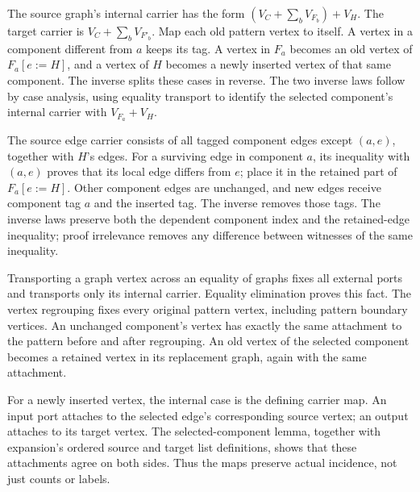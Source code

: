 



The source graph's internal carrier has the form
$(V_C+\sum_b V_{F_b})+V_H$. The target carrier is
$V_C+\sum_b V_{F'_b}$. Map each old pattern vertex to itself. A vertex in a
component different from $a$ keeps its tag. A vertex in $F_a$ becomes an
old vertex of $F_a[e:=H]$, and a vertex of $H$ becomes a newly inserted vertex
of that same component. The inverse splits these cases in reverse. The two
inverse laws follow by case analysis, using equality transport to identify
the selected component's internal carrier with $V_{F_a}+V_H$.







The source edge carrier consists of all tagged component edges except
$(a,e)$, together with $H$'s edges. For a surviving edge in component $a$,
its inequality with $(a,e)$ proves that its local edge differs from $e$;
place it in the retained part of $F_a[e:=H]$. Other component edges are
unchanged, and new edges receive component tag $a$ and the inserted tag.
The inverse removes those tags. The inverse laws preserve both the dependent
component index and the retained-edge inequality; proof irrelevance removes
any difference between witnesses of the same inequality.







Transporting a graph vertex across an equality of graphs fixes all external
ports and transports only its internal carrier. Equality elimination proves
this fact. The vertex regrouping fixes every original pattern vertex,
including pattern boundary vertices. An unchanged component's vertex has
exactly the same attachment to the pattern before and after regrouping.
An old vertex of the selected component becomes a retained vertex in its
replacement graph, again with the same attachment.

For a newly inserted vertex, the internal case is the defining carrier map.
An input port attaches to the selected edge's corresponding source vertex;
an output attaches to its target vertex. The selected-component lemma,
together with expansion's ordered source and target list definitions,
shows that these attachments agree on both sides. Thus the maps preserve
actual incidence, not just counts or labels.

